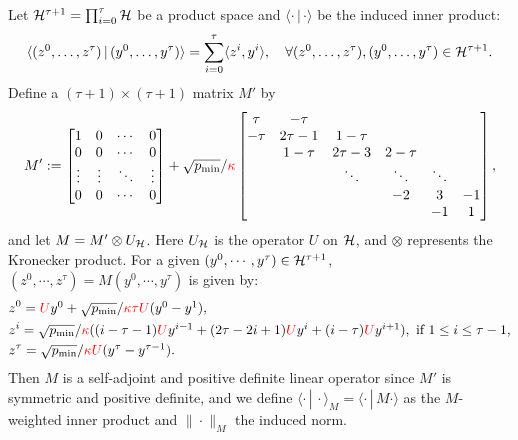 {Let ${\mathcal{H}}^{\tau+1}=\prod_{i=0}^{\tau}{\mathcal{H}}$ be a product space and $\langle\cdot\, |\,\cdot \rangle$ be the induced  inner product:
$$\langle (z^0,\ldots,z^{\tau})\,|\,(y^0,\ldots,y^{\tau})\rangle=\sum_{i=0}^{\tau}\langle z^i,y^i\rangle,\quad\forall (z^0,\ldots,z^{\tau}), (y^0,\ldots,y^{\tau})\in{\mathcal{H}}^{\tau+1}.$$ 
Define a $(\tau+1)\times(\tau+1)$ matrix $M'$ by 
\begin{equation*}%
M':=\begin{bmatrix}1 & 0 & \cdots &0\\
0 & 0 &\cdots & 0\\ \vdots &\vdots & \ddots & \vdots\\
0 & 0 &\cdots & 0 \end{bmatrix}
+\sqrt{p_{\min}}/{\color{red}{\kappa}}\begin{bmatrix} \tau & -\tau &  & \\
-\tau & 2\tau-1 & 1-\tau & \\
 & 1-\tau & 2\tau-3 & 2-\tau  & \\
 & & \ddots & \ddots & \ddots &\\
 & & & -2 & 3  & -1 \\
 & & & &-1 & 1
\end{bmatrix},
\end{equation*}
and let $M=M'\otimes U_{\mathcal{H}}$. Here $U_{\mathcal{H}}$ is the operator $U$ on ${\mathcal{H}}$, and
$\otimes$ represents the Kronecker product. For a given $(y^0,\cdots,y^\tau)\in{\mathcal{H}}^{\tau+1}$, $(z^0,\cdots,z^\tau)=M(y^0,\cdots,y^\tau)$ is given by:
\begin{align*}
&z^0=\textstyle
{\color{red}{U}}y^0+\sqrt{p_{\min}}/{\color{red}{\kappa}}{\color{red}{\tau U}}(y^0-y^1),\\
&z^i =
\textstyle\sqrt{p_{\min}}/{\color{red}{\kappa}}((i-\tau-1){\color{red}{U}}y^{i-1}+(2\tau-2i+1){\color{red}{U}}y^i+(i-\tau){\color{red}{U}}y^{i+1}),\text{
if } 1\le i\le \tau-1,\\
&z^{\tau}=\textstyle\sqrt{p_{\min}}/{\color{red}{\kappa}}{\color{red}{U}}(y^{\tau}-y^{\tau-1}).
\end{align*} 
Then $M$ is a self-adjoint and positive definite linear operator since $M'$ is
symmetric and positive definite, and we define $\langle\cdot\, |\,
\cdot\rangle_M=\langle\cdot\, |\, M\cdot\rangle$ as the $M$-weighted inner
product and $\|\cdot\|_M$ the induced norm.
 
}
